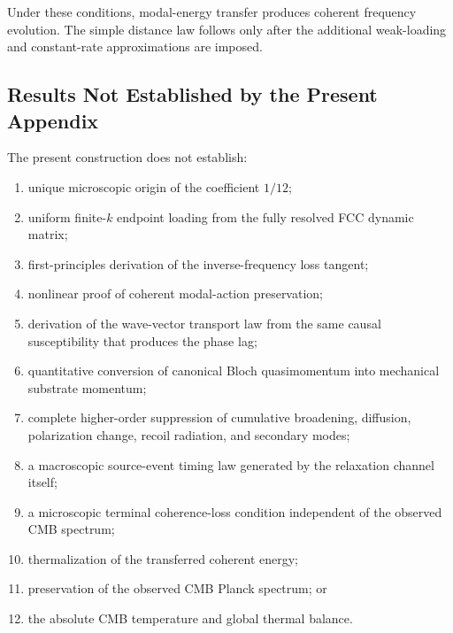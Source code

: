 Under these conditions, modal-energy transfer produces coherent frequency
evolution. The simple distance law follows only after the additional
weak-loading and constant-rate approximations are imposed.


\subsection{Results Not Established by the Present Appendix}
\label{subsec:photon_relaxation_not_established}

The present construction does not establish:

\begin{enumerate}
    \item unique microscopic origin of the coefficient \(1/12\);

    \item uniform finite-\(k\) endpoint loading from the fully resolved FCC
    dynamic matrix;

    \item first-principles derivation of the inverse-frequency loss tangent;

    \item nonlinear proof of coherent modal-action preservation;

    \item derivation of the wave-vector transport law from the same causal
    susceptibility that produces the phase lag;

    \item quantitative conversion of canonical Bloch quasimomentum into
    mechanical substrate momentum;

    \item complete higher-order suppression of cumulative broadening,
    diffusion, polarization change, recoil radiation, and secondary modes;

    \item a macroscopic source-event timing law generated by the relaxation
    channel itself;

    \item a microscopic terminal coherence-loss condition independent of the
    observed CMB spectrum;

    \item thermalization of the transferred coherent energy;

    \item preservation of the observed CMB Planck spectrum; or

    \item the absolute CMB temperature and global thermal balance.
\end{enumerate}


